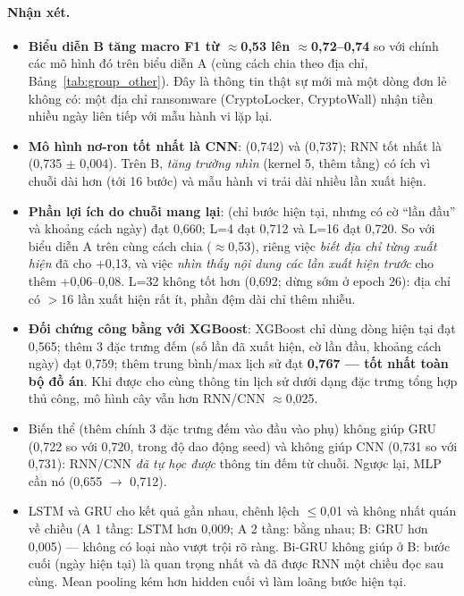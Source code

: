 \paragraph{Nhận xét.}
\begin{itemize}
\item \textbf{Biểu diễn B tăng macro F1 từ $\approx$0,53 lên $\approx$0,72--0,74} so với chính các mô hình đó trên biểu diễn A
  (cùng cách chia theo địa chỉ, Bảng~\ref{tab:group_other}). Đây là thông tin thật sự mới mà một dòng đơn lẻ không có: một địa
  chỉ ransomware (CryptoLocker, CryptoWall) nhận tiền nhiều ngày liên tiếp với mẫu hành vi lặp lại.
\item \textbf{Mô hình nơ-ron tốt nhất là CNN}:  (0,742) và  (0,737); RNN tốt nhất là
   (0,735 $\pm$ 0,004). Trên B, \emph{tăng trường nhìn} (kernel 5, thêm tầng) có ích vì chuỗi dài hơn
  (tới 16 bước) và mẫu hành vi trải dài nhiều lần xuất hiện.
\item \textbf{Phần lợi ích do chuỗi mang lại}:  (chỉ bước hiện tại, nhưng có cờ ``lần đầu'' và khoảng cách ngày)
  đạt 0,660; L=4 đạt 0,712 và L=16 đạt 0,720. So với biểu diễn A trên cùng cách chia ($\approx$0,53), riêng việc \emph{biết địa chỉ
  từng xuất hiện} đã cho +0,13, và việc \emph{nhìn thấy nội dung các lần xuất hiện trước} cho thêm +0,06--0,08. L=32 không tốt hơn (0,692; dừng sớm ở epoch 26):
  địa chỉ có $>$16 lần xuất hiện rất ít, phần đệm dài chỉ thêm nhiễu.
\item \textbf{Đối chứng công bằng với XGBoost}: XGBoost chỉ dùng dòng hiện tại đạt 0,565; thêm 3 đặc trưng đếm
  (số lần đã xuất hiện, cờ lần đầu, khoảng cách ngày) đạt 0,759; thêm trung bình/max lịch sử đạt \textbf{0,767 --- tốt nhất toàn
  bộ đồ án}. Khi được cho cùng thông tin lịch sử dưới dạng đặc trưng tổng hợp thủ công, mô hình cây vẫn hơn RNN/CNN $\approx$0,025.
\item Biến thể  (thêm chính 3 đặc trưng đếm vào đầu vào phụ) không giúp GRU (0,722 so với 0,720, trong độ dao động seed) và
  không giúp CNN (0,731 so với 0,731): RNN/CNN \emph{đã tự học được} thông tin đếm từ chuỗi. Ngược lại, MLP cần nó (0,655 $\to$ 0,712).
\item LSTM và GRU cho kết quả gần nhau, chênh lệch $\le$0,01 và không nhất quán về chiều (A 1 tầng: LSTM hơn 0,009; A 2 tầng:
  bằng nhau; B: GRU hơn 0,005) --- không có loại nào vượt trội rõ ràng. Bi-GRU không giúp ở B: bước cuối
  (ngày hiện tại) là quan trọng nhất và đã được RNN một chiều đọc sau cùng. Mean pooling kém hơn hidden cuối vì làm loãng bước
  hiện tại.
\end{itemize}

